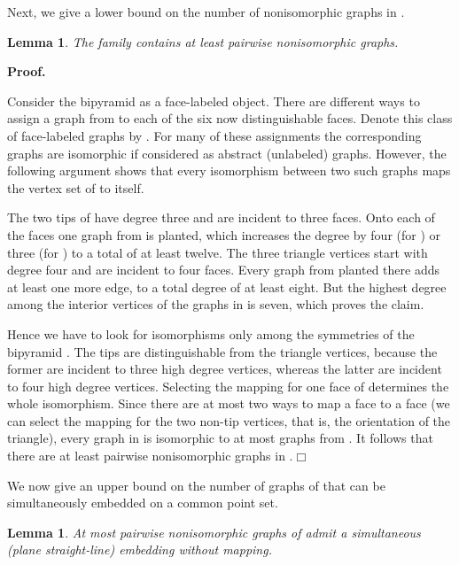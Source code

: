 \documentclass[11pt]{article}
\newtheorem{lemma}[equation]{Lemma}
\newcommand{\qed}{\hfill\ensuremath{\Box}}
\newenvironment{proof}{\noindent\textbf{Proof.}
}{\par\medskip}
\begin{document}
Next, we give a lower bound on the number of nonisomorphic graphs in
.
\begin{lemma}
  The family  contains at least  pairwise nonisomorphic
  graphs.
\end{lemma}
\begin{proof}
  Consider the bipyramid  as a face-labeled object. There are  different
  ways to assign a graph from  to each of the six now
  distinguishable faces. Denote this class of face-labeled graphs by
  . For many of these assignments the corresponding graphs are
  isomorphic if considered as abstract (unlabeled) graphs. However, the
  following argument shows that every isomorphism between two such graphs maps
  the vertex set of  to itself.

  The two tips of  have degree three and are incident to three faces. Onto
  each of the faces one graph from  is planted, which increases the
  degree by four (for ) or three (for ) to a total of at
  least twelve. The three triangle vertices start with degree four and are
  incident to four faces. Every graph from  planted there adds at
  least one more edge, to a total degree of at least eight. But the highest
  degree among the interior vertices of the graphs in  is seven,
  which proves the claim.

  Hence we have to look for isomorphisms only among the symmetries of the
  bipyramid . The tips are distinguishable from the triangle vertices,
  because the former are incident to three high degree vertices, whereas the
  latter are incident to four high degree vertices. Selecting the mapping for
  one face of  determines the whole isomorphism. Since there are at most two
  ways to map a face to a face (we can select the mapping for the two non-tip
  vertices, that is, the orientation of the triangle), every graph in
   is isomorphic to at most  graphs from
  . It follows that there are at least  pairwise
  nonisomorphic graphs in .\qed
\end{proof}
We now give an upper bound on the number of graphs of  that can be
simultaneously embedded on a common point set.
\begin{lemma}
  At most  pairwise nonisomorphic graphs of  admit a
  simultaneous (plane straight-line) embedding without mapping.
\end{lemma}
\end{document}

